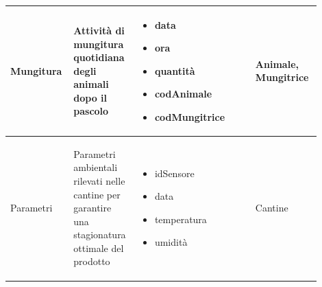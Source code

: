\documentclass[12pt,a4paper]{article}
\begin{document}
\begin{center}
\begin{longtable}{|p{0.14\linewidth}|p{0.20\linewidth}|p{0.36\linewidth}|p{0.20\linewidth}|}
\hline
Mungitura				 	& \begin{flushleft}\vspace{-25pt} Attività di mungitura quotidiana degli animali dopo il pascolo \end{flushleft}
					& \begin{itemize}
						\setlength{\itemindent}{-1em}
						\vspace{-25pt}
						\setlength\itemsep{-0.25em}
						\item data
						\item ora
						\item quantità
						\item codAnimale
						\item codMungitrice
					\end{itemize}
					& \begin{flushleft}\vspace{-25pt} Animale, Mungitrice \end{flushleft} \\ 

\hline
Parametri				 	& \begin{flushleft}\vspace{-25pt} Parametri ambientali rilevati nelle cantine per garantire una stagionatura ottimale del prodotto \end{flushleft}
					& \begin{itemize}
						\setlength{\itemindent}{-1em}
						\vspace{-25pt}
						\setlength\itemsep{-0.25em}
						\item idSensore
						\item data
						\item temperatura
						\item umidità
						
					\end{itemize}
					& \begin{flushleft}\vspace{-25pt} Cantine \end{flushleft} \\ 


\end{longtable}
\end{center}
\end{document}
